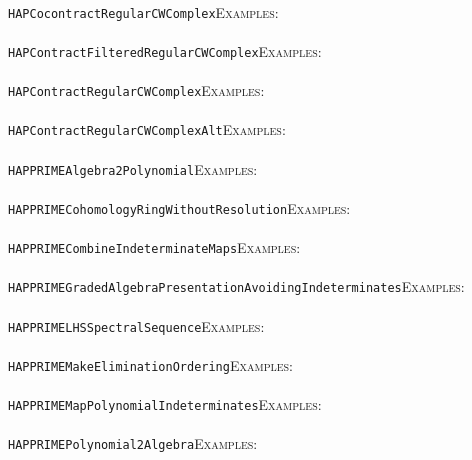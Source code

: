 \documentclass[a4paper,11pt]{report}
\begin{document}
{{ \\
 \texttt{HAPCocontractRegularCWComplex}{\nobreakspace}{\nobreakspace}{\nobreakspace}{\nobreakspace}\textsc{Examples:} \\
 \\
 \texttt{HAPContractFilteredRegularCWComplex}{\nobreakspace}{\nobreakspace}{\nobreakspace}{\nobreakspace}\textsc{Examples:} \\
 \\
 \texttt{HAPContractRegularCWComplex}{\nobreakspace}{\nobreakspace}{\nobreakspace}{\nobreakspace}\textsc{Examples:} \\
 \\
 \texttt{HAPContractRegularCWComplex{\textunderscore}Alt}{\nobreakspace}{\nobreakspace}{\nobreakspace}{\nobreakspace}\textsc{Examples:} \\
 \\
 \texttt{HAPPRIME{\textunderscore}Algebra2Polynomial}{\nobreakspace}{\nobreakspace}{\nobreakspace}{\nobreakspace}\textsc{Examples:} \\
 \\
 \texttt{HAPPRIME{\textunderscore}CohomologyRingWithoutResolution}{\nobreakspace}{\nobreakspace}{\nobreakspace}{\nobreakspace}\textsc{Examples:} \\
 \\
 \texttt{HAPPRIME{\textunderscore}CombineIndeterminateMaps}{\nobreakspace}{\nobreakspace}{\nobreakspace}{\nobreakspace}\textsc{Examples:} \\
 \\
 \texttt{HAPPRIME{\textunderscore}GradedAlgebraPresentationAvoidingIndeterminates}{\nobreakspace}{\nobreakspace}{\nobreakspace}{\nobreakspace}\textsc{Examples:} \\
 \\
 \texttt{HAPPRIME{\textunderscore}LHSSpectralSequence}{\nobreakspace}{\nobreakspace}{\nobreakspace}{\nobreakspace}\textsc{Examples:} \\
 \\
 \texttt{HAPPRIME{\textunderscore}MakeEliminationOrdering}{\nobreakspace}{\nobreakspace}{\nobreakspace}{\nobreakspace}\textsc{Examples:} \\
 \\
 \texttt{HAPPRIME{\textunderscore}MapPolynomialIndeterminates}{\nobreakspace}{\nobreakspace}{\nobreakspace}{\nobreakspace}\textsc{Examples:} \\
 \\
 \texttt{HAPPRIME{\textunderscore}Polynomial2Algebra}{\nobreakspace}{\nobreakspace}{\nobreakspace}{\nobreakspace}\textsc{Examples:} \\
}}
\end{document}

